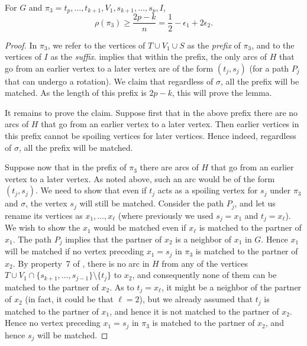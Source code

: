 \documentclass{toc}
\theoremstyle{plain}
\begin{document}
\begin{lemma}
	\label{lem:sort1}
For $G$ and $\pi_3 = t_p, \ldots, t_{k+1}, V_1, s_{k+1}, \ldots, s_p, I$,
$$\rho(\pi_3) \ge \frac{2p - k}{n} = \frac{1}{2} - \epsilon_1 + 2\epsilon_2.$$
\end{lemma}

\begin{proof}
	In $\pi_3$, we refer to the vertices of $T \cup V_1 \cup S$ as the \emph{prefix} of $\pi_3$, and to the vertices of $I$ as the \emph{suffix}.  implies that within the prefix, the only arcs of $H$ that go from an earlier vertex to a later vertex are of the form $(t_j,s_j)$ (for a path $P_j$ that can undergo a rotation). We claim that regardless of $\sigma$, all the prefix will be matched. As the length of this prefix is $2p - k$, this will prove the lemma.
	
	It remains to prove the claim. Suppose first that in the above prefix there are no arcs of $H$ that go from an earlier vertex to a later vertex. Then earlier vertices
	in this prefix cannot be spoiling vertices for later vertices. Hence indeed,
	regardless of $\sigma$, all the prefix will be matched.
	
	Suppose now that in the prefix of $\pi_3$ there are arcs of $H$ that go from an earlier vertex to a later vertex. As noted above, such an arc would be of the form $(t_j,s_j)$. We need to show that even if $t_j$ acts as a spoiling vertex for $s_j$ under $\pi_3$ and $\sigma$, the vertex $s_j$ will still be matched. Consider the path $P_j$, and let us rename its vertices as $x_1, \ldots, x_{\ell}$ (where previously we used $s_j = x_1$ and $t_j = x_{\ell}$). We wish to show the $x_1$ would be matched even if $x_{\ell}$ is matched to the partner of $x_1$. The path $P_j$ implies that the partner of $x_2$ is a neighbor of $x_1$ in $G$. Hence $x_1$ will be matched if no vertex preceding $x_1 = s_j$ in $\pi_3$ is matched to the partner of $x_2$. By property~7 of , there is no arc in $H$ from any of the vertices $T \cup V_1 \cap \{s_{k+1}, \ldots, s_{j-1}\} \setminus \{t_j\}$ to $x_2$, and consequently none of them can be matched to the partner of $x_2$. As to $t_j = x_{\ell}$, it might be a neighbor of the partner of $x_2$ (in fact, it could be that $\ell = 2$), but we already assumed that $t_j$ is matched to the partner of $x_1$, and hence it is not matched to the partner of $x_2$. Hence no vertex preceding $x_1 = s_j$ in $\pi_3$ is matched to the partner of $x_2$, and hence $s_j$ will be matched.
\end{proof}
\end{document}

